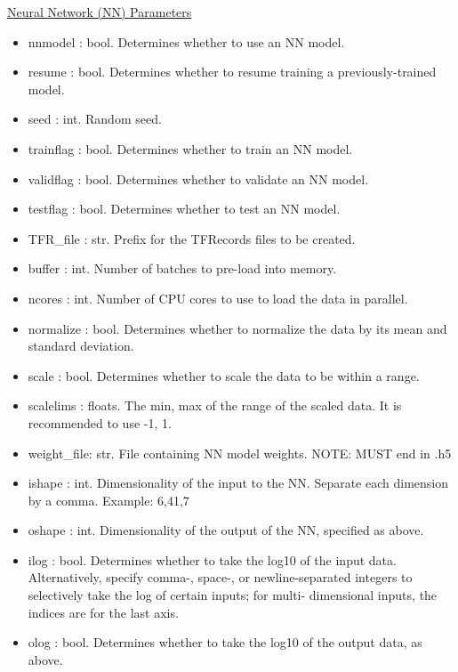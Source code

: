 \documentclass[letterpaper, 12pt]{article}
\begin{document}
\noindent \underline{Neural Network (NN) Parameters}
\begin{itemize}
\item nnmodel    : bool. Determines whether to use an NN model.
\item resume     : bool. Determines whether to resume training a previously-trained 
                   model.
\item seed       : int.  Random seed.
\item trainflag  : bool. Determines whether to train    an NN model.
\item validflag  : bool. Determines whether to validate an NN model.
\item testflag   : bool. Determines whether to test     an NN model.

\item TFR\_file  : str.  Prefix for the TFRecords files to be created.
\item buffer     : int.  Number of batches to pre-load into memory.
\item ncores     : int.  Number of CPU cores to use to load the data in parallel.

\item normalize  : bool. Determines whether to normalize the data by its mean and 
                   standard deviation.
\item scale      : bool. Determines whether to scale the data to be within a range.
\item scalelims  : floats. The min, max of the range of the scaled data.
                     It is recommended to use -1, 1.

\item weight\_file: str.  File containing NN model weights.
                          NOTE: MUST end in .h5
\item ishape  : int.  Dimensionality of the input to the NN.  Separate each 
                      dimension by a comma.  Example: 6,41,7
\item oshape : int.  Dimensionality of the output of the NN, specified as above.
\item ilog        : bool. Determines whether to take the log10 of the input data.
                          Alternatively, specify comma-, space-, or newline-separated 
                          integers to selectively take the log of certain inputs; for multi-
                          dimensional inputs, the indices are for the last axis.
\item olog        : bool. Determines whether to take the log10 of the output data,
                          as above.


\end{itemize}
\end{document}
